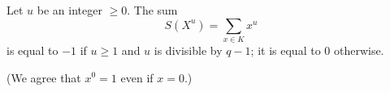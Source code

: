 Let $u$ be an integer $\geq 0$. The sum
$$S(X^u) = \sum_{x \in K} x^u$$
is equal to $-1$ if $u \geq 1$ and $u$ is divisible by $q-1$; it is equal to $0$ otherwise.

(We agree that $x^0 = 1$ even if $x = 0$.)
